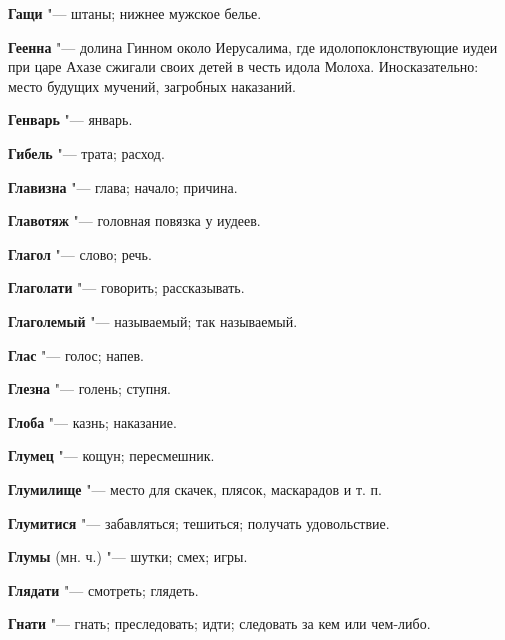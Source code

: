 \begin{mymulticols}{2}
\noindent\textbf{Гащи} "--- штаны; нижнее мужское белье. 




\noindent\textbf{Геенна} "--- долина Гинном около Иерусалима, где идолопоклонствующие иудеи при царе Ахазе сжигали своих детей в честь идола Молоха. Иносказательно: место будущих мучений, загробных наказаний. 




\noindent\textbf{Генварь} "--- январь. 




\noindent\textbf{Гибель} "--- трата; расход. 




\noindent\textbf{Главизна} "--- глава; начало; причина. 




\noindent\textbf{Главотяж} "--- головная повязка у иудеев. 




\noindent\textbf{Глагол} "--- слово; речь. 




\noindent\textbf{Глаголати} "--- говорить; рассказывать. 




\noindent\textbf{Глаголемый} "--- называемый; так называемый. 




\noindent\textbf{Глас} "--- голос; напев. 




\noindent\textbf{Глезна} "--- голень; ступня. 




\noindent\textbf{Глоба} "--- казнь; наказание. 




\noindent\textbf{Глумец} "--- кощун; пересмешник. 




\noindent\textbf{Глумилище} "--- место для скачек, плясок, маскарадов и т. п. 




\noindent\textbf{Глумитися} "--- забавляться; тешиться; получать удовольствие. 




\noindent\textbf{Глумы} (мн. ч.) "--- шутки; смех; игры. 




\noindent\textbf{Глядати} "--- смотреть; глядеть. 




\noindent\textbf{Гнати} "--- гнать; преследовать; идти; следовать за кем или чем-либо. 





\end{mymulticols}
